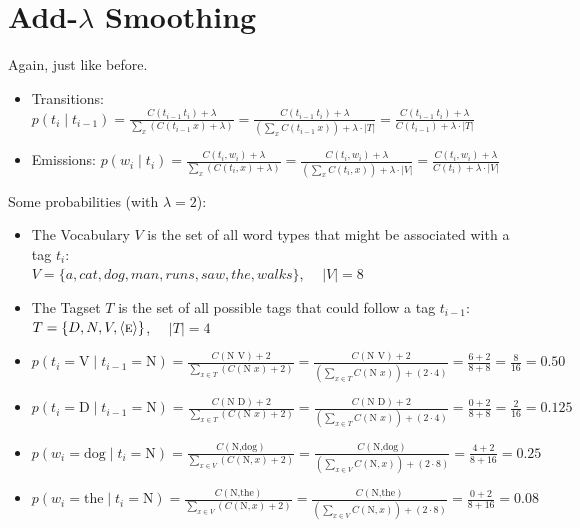 \documentclass[11pt,letterpaper]{article}
\newcommand{\ngramend}{\ensuremath{\langle \textsc{e} \rangle}}
\newcommand{\tcurr}{\ensuremath{t_i}}
\newcommand{\tprev}{\ensuremath{t_{i-1}}}
\begin{document}
\section{Add-$\lambda$ Smoothing}

Again, just like before.

\begin{itemize}
  \item Transitions: $p(t_i \mid t_{i-1}) 
             = \frac{C(t_{i-1}~t_i)+\lambda}{\sum_x (C(t_{i-1}~x)+\lambda)} 
             = \frac{C(t_{i-1}~t_i)+\lambda}{(\sum_x C(t_{i-1}~x))+\lambda\cdot|T|} 
             = \frac{C(t_{i-1}~t_i)+\lambda}{C(t_{i-1})+\lambda\cdot|T|}$
  \item Emissions: $p(w_i \mid t_i) 
             = \frac{C(t_i,w_i)+\lambda}{\sum_x (C(t_i,x)+\lambda)} 
             = \frac{C(t_i,w_i)+\lambda}{(\sum_x C(t_i,x))+\lambda\cdot|V|} 
             = \frac{C(t_i,w_i)+\lambda}{C(t_i)+\lambda\cdot|V|}$
\end{itemize}

Some probabilities (with $\lambda=2$):

\begin{itemize}
  \item The Vocabulary $V$ is the set of all word types that might be associated with a tag \tcurr:   \vspace{2mm} \\
  $V = \{ a, cat, dog, man, runs, saw, the, walks \}$, ~~$|V|=8$
  \item The Tagset $T$ is the set of all possible tags that could follow a tag \tprev:   \vspace{2mm} \\
        $T = \{ D, N, V, \ngramend \}$, ~~$|T|=4$
  \\
  \item $p(t_i=\text{V} \mid t_{i-1}=\text{N}) 
     = \frac{C(\text{N V})+2}{\sum_{x \in T} (C(\text{N } x)+2)} 
     = \frac{C(\text{N V})+2}{(\sum_{x \in T} C(\text{N } x))+(2 \cdot 4)} 
     = \frac{6+2}{8+8} 
     = \frac{8}{16} = 0.50$
  \item $p(t_i=\text{D} \mid t_{i-1}=\text{N}) 
     = \frac{C(\text{N D})+2}{\sum_{x \in T} (C(\text{N } x)+2)} 
     = \frac{C(\text{N D})+2}{(\sum_{x \in T} C(\text{N } x))+(2 \cdot 4)} 
     = \frac{0+2}{8+8}
     = \frac{2}{16} = 0.125$
  \\
  \item $p(w_i=\text{dog} \mid t_i=\text{N}) 
     = \frac{C(\text{N,dog})}{\sum_{x \in V} (C(\text{N},x)+2)} 
     = \frac{C(\text{N,dog})}{(\sum_{x \in V} C(\text{N},x))+(2 \cdot 8)} 
     = \frac{4+2}{8+16}
     = 0.25$
  \item $p(w_i=\text{the} \mid t_i=\text{N}) 
     = \frac{C(\text{N,the})}{\sum_{x \in V} (C(\text{N},x)+2)} 
     = \frac{C(\text{N,the})}{(\sum_{x \in V} C(\text{N},x))+(2 \cdot 8)} 
     = \frac{0+2}{8+16} 
     = 0.08$
\end{itemize}
\end{document}
